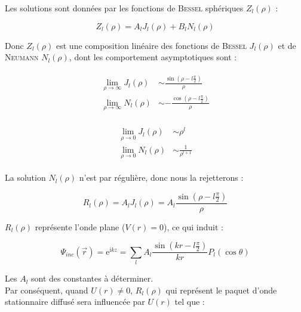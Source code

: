 \documentclass[12pt,a4paper,oneside,french]{book}
\renewcommand{\i}{\mathrm{i}}
\newcommand{\e}{\mathrm{e}}
\theoremstyle{definition}
\theoremstyle{definition}
\theoremstyle{definition}
\theoremstyle{remark}
\theoremstyle{definition}
\begin{document}
    Les solutions sont données par les fonctions de \textsc{Bessel} sphériques ${Z}_{l}(\rho)$ :
    
    \begin{equation*}
        {Z}_{l}(\rho) = {A}_{l} {J}_{l}(\rho) + {B}_{l} {N}_{l}(\rho)
    \end{equation*}
    
    Donc ${Z}_{l}(\rho)$ est une composition linéaire des fonctions de \textsc{Bessel} ${J}_{l}(\rho)$ et de \textsc{Neumann} ${N}_{l}(\rho)$, dont les comportement asymptotiques sont :
    
    \begin{align*}
    \begin{split}
        \lim_{\rho \to \infty} {J}_{l}(\rho) &\sim \frac{\sin\left(\rho - l \frac{\pi}{2}\right)}{\rho} \\
        \lim_{\rho \to \infty} {N}_{l}(\rho) &\sim -\frac{\cos\left(\rho - l \frac{\pi}{2}\right)}{\rho}
    \end{split}
    \end{align*}
    
    \begin{align*}
    \begin{split}
        \lim_{\rho \to 0} {J}_{l}(\rho) &\sim {\rho}^{l} \\
        \lim_{\rho \to 0} {N}_{l}(\rho) &\sim \frac{1}{{\rho}^{l + 1}}
    \end{split}
    \end{align*}
    
    La solution ${N}_{l}(\rho)$ n'est par régulière, donc nous la rejetterons :
    
    \begin{equation*}
        {R}_{l}(\rho) = {A}_{l} {J}_{l}(\rho) = {A}_{l} \frac{\sin\left(\rho - l \frac{\pi}{2}\right)}{\rho}
    \end{equation*}
    
    ${R}_{l}(\rho)$ représente l'onde plane ($V(r) = 0$), ce qui induit :
    
    \begin{equation*}
        {\Psi}_{inc}(\vec{r}) = {\e}^{\i k z} = \sum_{l} {A}_{l} \frac{\sin\left(k r - l \frac{\pi}{2}\right)}{k r} {P}_{l}(\cos{\theta})
    \end{equation*}
    
    Les ${A}_{l}$ sont des constantes à déterminer. \\
    
    Par conséquent, quand $U(r) \neq 0$, ${R}_{l}(\rho)$ qui représent le paquet d'onde stationnaire diffusé sera influencée par $U(r)$ tel que :
    
\end{document}
